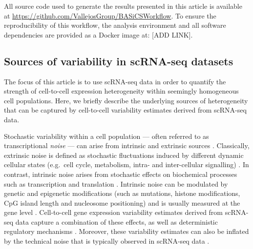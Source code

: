 \documentclass[9pt,a4paper,]{extarticle}
\begin{document}
All source code used to generate the results presented in this article is
available at \url{https://github.com/VallejosGroup/BASiCSWorkflow}. To ensure the
reproducibility of this workflow, the analysis environment and all software
dependencies are provided as a Docker \citep{Boettiger2014} image at: {[}ADD LINK{]}.

\hypertarget{sources-of-variability-in-scrna-seq-datasets}{%
\subsection{Sources of variability in scRNA-seq datasets}\label{sources-of-variability-in-scrna-seq-datasets}}

The focus of this article is to use scRNA-seq data in order to quantify the
strength of cell-to-cell expression heterogeneity within seemingly homogeneous
cell populations.
Here, we briefly describe the underlying sources of heterogeneity that can be
captured by cell-to-cell variability estimates derived from scRNA-seq data.

Stochastic variability within a cell population --- often referred to as
transcriptional \emph{noise} --- can arise from intrinsic and extrinsic sources
\citep{Elowitz2002, Eling2019}.
Classically, extrinsic noise is defined as stochastic fluctuations induced by
different dynamic cellular states (e.g.~cell cycle, metabolism, intra- and
inter-cellular signalling)
\citep{Zopf2013, Iwamoto2016, Kiviet2014}.
In contrast, intrinsic noise arises from stochastic effects on biochemical
processes such as transcription and translation \citep{Elowitz2002}.
Intrinsic noise can be modulated by genetic and epigenetic modifications (such
as mutations, histone modifications, CpG island length and nucleosome
positioning) \citep{Eberwine2015, Faure2017, Morgan2018} and is usually measured
at the gene level \citep{Elowitz2002}.
Cell-to-cell gene expression variability estimates derived from scRNA-seq data
capture a combination of these effects, as well as deterministic regulatory
mechanisms \citep{Eling2019}.
Moreover, these variability estimates can also be inflated by the technical
noise that is typically observed in scRNA-seq data \citep{Brennecke2013}.
\end{document}
